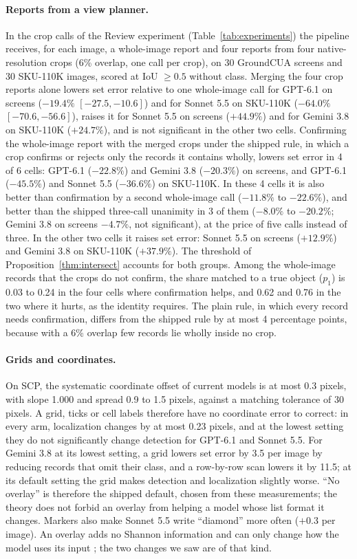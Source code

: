 \paragraph{Reports from a view planner.} In the crop calls of the Review experiment (Table~\ref{tab:experiments}) the pipeline receives, for each image, a whole-image report and four reports from four native-resolution crops (6\% overlap, one call per crop), on 30 GroundCUA screens and 30 SKU-110K images, scored at IoU $\ge0.5$ without class. Merging the four crop reports alone lowers set error relative to one whole-image call for GPT-6.1 on screens ($-19.4\%$ $[-27.5,-10.6]$) and for Sonnet 5.5 on SKU-110K ($-64.0\%$ $[-70.6,-56.6]$), raises it for Sonnet 5.5 on screens ($+44.9\%$) and for Gemini 3.8 on SKU-110K ($+24.7\%$), and is not significant in the other two cells. Confirming the whole-image report with the merged crops under the shipped rule, in which a crop confirms or rejects only the records it contains wholly, lowers set error in 4 of 6 cells: GPT-6.1 ($-22.8\%$) and Gemini 3.8 ($-20.3\%$) on screens, and GPT-6.1 ($-45.5\%$) and Sonnet 5.5 ($-36.6\%$) on SKU-110K. In these 4 cells it is also better than confirmation by a second whole-image call ($-11.8\%$ to $-22.6\%$), and better than the shipped three-call unanimity in 3 of them ($-8.0\%$ to $-20.2\%$; Gemini 3.8 on screens $-4.7\%$, not significant), at the price of five calls instead of three. In the other two cells it raises set error: Sonnet 5.5 on screens ($+12.9\%$) and Gemini 3.8 on SKU-110K ($+37.9\%$). The threshold of Proposition~\ref{thm:intersect} accounts for both groups. Among the whole-image records that the crops do not confirm, the share matched to a true object ($p_1$) is 0.03 to 0.24 in the four cells where confirmation helps, and 0.62 and 0.76 in the two where it hurts, as the identity requires. The plain rule, in which every record needs confirmation, differs from the shipped rule by at most 4 percentage points, because with a 6\% overlap few records lie wholly inside no crop.

\paragraph{Grids and coordinates.} On SCP, the systematic coordinate offset of current models is at most 0.3 pixels, with slope 1.000 and spread 0.9 to 1.5 pixels, against a matching tolerance of 30 pixels. A grid, ticks or cell labels therefore have no coordinate error to correct: in every arm, localization changes by at most 0.23 pixels, and at the lowest setting they do not significantly change detection for GPT-6.1 and Sonnet 5.5. For Gemini 3.8 at its lowest setting, a grid lowers set error by 3.5 per image by reducing records that omit their class, and a row-by-row scan lowers it by 11.5; at its default setting the grid makes detection and localization slightly worse. ``No overlay'' is therefore the shipped default, chosen from these measurements; the theory does not forbid an overlay from helping a model whose list format it changes. Markers also make Sonnet 5.5 write ``diamond'' more often ($+0.3$ per image). An overlay adds no Shannon information and can only change how the model uses its input \citep{shi2026zoomin}; the two changes we saw are of that kind.

